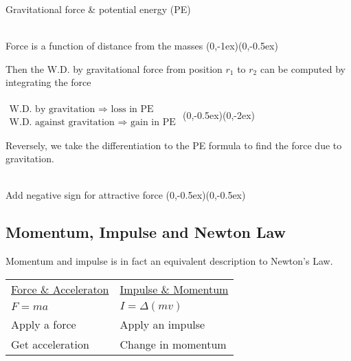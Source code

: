 \documentclass[class=article, crop=false, 12pt]{standalone}
\begin{document}
\begin{example} Gravitational force \& potential energy (PE)

    \\
    {Force is a function of distance from the masses}
    {(0,-1ex)}{(0,-0.5ex)}
    
    Then the W.D. by gravitational force from position $r_1$ to $r_2$ can be computed by integrating the force
    \\\\
    {$\substack{\displaystyle\text{W.D. by gravitation } \Rightarrow \text{ loss in PE} \\ \displaystyle\text{W.D. against gravitation }\Rightarrow \text{ gain in PE}}$}
    {(0,-0.5ex)}{(0,-2ex)}

    Reversely, we take the  differentiation to the PE formula to find the force due to gravitation.

    \\
    {Add negative sign for attractive force}
    {(0,-0.5ex)}{(0,-0.5ex)}

\end{example}

\subsection{Momentum, Impulse and Newton  Law}

Momentum and impulse is in fact an equivalent description to Newton's  Law.

\begin{center}
    \begin{tabular}{ >{\centering\arraybackslash}m{15em} | >{\centering\arraybackslash}m{15em} }
        \ul{Force \& Acceleraton} & \ul{Impulse \& Momentum} \\ 
        $F=ma$ & $I=\Delta(mv)$ \\  
        Apply a force & Apply an impulse \\
        Get acceleration & Change in momentum    
    \end{tabular}
\end{center}
\end{document}
